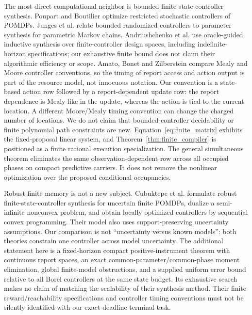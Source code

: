The most direct computational neighbor is bounded finite-state-controller synthesis. Poupart and Boutilier\cite{poupart} optimize restricted stochastic controllers of POMDPs. Junges et al.\cite{junges} relate bounded randomized controllers to parameter synthesis for parametric Markov chains. Andriushchenko et al.\cite{andriushchenko} use oracle-guided inductive synthesis over finite-controller design spaces, including indefinite-horizon specifications; our exhaustive finite bound does not claim their algorithmic efficiency or scope. Amato, Bonet and Zilberstein\cite{amato} compare Mealy and Moore controller conventions, so the timing of report access and action output is part of the resource model, not innocuous notation. Our convention is a state-based action row followed by a report-dependent update row: the report dependence is Mealy-like in the update, whereas the action is tied to the current location. A different Moore/Mealy timing convention can change the charged number of locations. We do not claim that bounded-controller decidability or finite polynomial path constraints are new. Equation~\eqref{eq:finite_matrix} exhibits the fixed-proposal linear system, and Theorem~\ref{thm:finite_compiler} is positioned as a finite rational execution specialization. The general simultaneous theorem eliminates the same observation-dependent row across all occupied phases on compact predictive carriers. It does not remove the nonlinear optimization over the proposed conditional occupancies.

Robust finite memory is not a new subject. Cubuktepe et al.\cite{robustfsc} formulate robust finite-state-controller synthesis for uncertain finite POMDPs, dualize a semi-infinite nonconvex problem, and obtain locally optimized controllers by sequential convex programming. Their model also uses support-preserving uncertainty assumptions. Our comparison is not ``uncertainty versus known models'': both theories constrain one controller across model uncertainty. The additional statement here is a fixed-horizon compact positive-instrument theorem with continuous report spaces, an exact common-parameter/common-phase moment elimination, global finite-model obstructions, and a supplied uniform error bound relative to all Borel controllers at the same state budget. Its exhaustive search makes no claim of matching the scalability of their synthesis method. Their finite reward/reachability specifications and controller timing conventions must not be silently identified with our exact-deadline terminal task.

